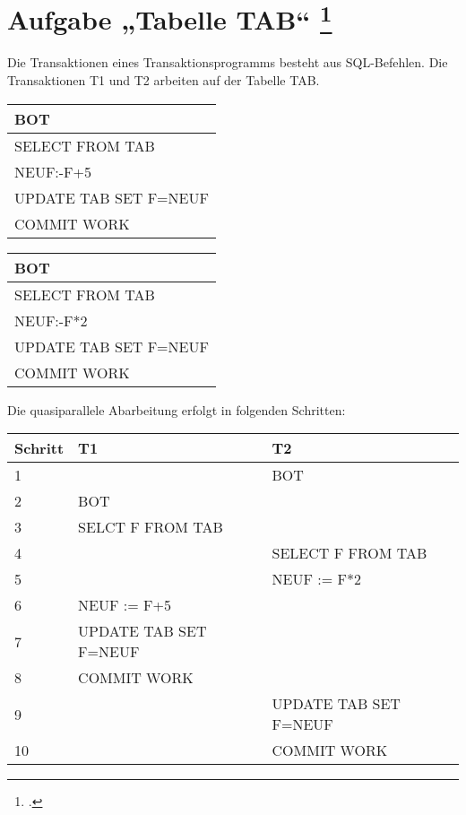 \documentclass{lehramt-informatik-aufgabe}
\begin{document}

\section{Aufgabe „Tabelle TAB“
\footcite{db:ab:6}}

Die Transaktionen eines Transaktionsprogramms besteht aus SQL-Befehlen.
Die Transaktionen T1 und T2 arbeiten auf der Tabelle TAB.

\begin{multicols}{2}

\begin{tabular}{|l|}
\hline
BOT                   \\\hline
SELECT FROM TAB       \\\hline
NEUF:-F+5             \\\hline
UPDATE TAB SET F=NEUF \\\hline
COMMIT WORK           \\\hline
\end{tabular}


\begin{tabular}{|l|}
\hline
BOT                   \\\hline
SELECT FROM TAB       \\\hline
NEUF:-F*2             \\\hline
UPDATE TAB SET F=NEUF \\\hline
COMMIT WORK           \\\hline
\end{tabular}
\end{multicols}

\noindent
Die quasiparallele Abarbeitung erfolgt in folgenden Schritten:

\begin{center}
\begin{tabular}{|l|l|l|}
\hline
Schritt & T1                    & T2                    \\\hline
1       &                       & BOT                   \\\hline
2       & BOT                   &                       \\\hline
3       & SELCT F FROM TAB      &                       \\\hline
4       &                       & SELECT F FROM TAB     \\\hline
5       &                       & NEUF := F*2           \\\hline
6       & NEUF := F+5           &                       \\\hline
7       & UPDATE TAB SET F=NEUF &                       \\\hline
8       & COMMIT WORK           &                       \\\hline
9       &                       & UPDATE TAB SET F=NEUF \\\hline
10      &                       & COMMIT WORK           \\\hline
\end{tabular}
\end{center}
\end{document}
